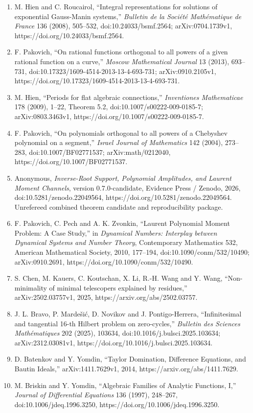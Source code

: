 \documentclass[
  11pt,
  a4paper,
]{amsart}
\begin{document}
\begin{enumerate}
{  ISSAC 2013}, 93--100, doi:10.1145/2465506.2465935; arXiv:1301.4313v2,
  https://doi.org/10.1145/2465506.2465935.
\item
  M. Hien and C. Roucairol, ``Integral representations for solutions of
  exponential Gauss-Manin systems,'' \emph{Bulletin de la Société
  Mathématique de France} 136 (2008), 505--532, doi:10.24033/bsmf.2564;
  arXiv:0704.1739v1, https://doi.org/10.24033/bsmf.2564.
\item
  F. Pakovich, ``On rational functions orthogonal to all powers of a
  given rational function on a curve,'' \emph{Moscow Mathematical
  Journal} 13 (2013), 693--731,
  doi:10.17323/1609-4514-2013-13-4-693-731; arXiv:0910.2105v1,
  https://doi.org/10.17323/1609-4514-2013-13-4-693-731.
\item
  M. Hien, ``Periods for flat algebraic connections,'' \emph{Inventiones
  Mathematicae} 178 (2009), 1--22, Theorem 5.2,
  doi:10.1007/s00222-009-0185-7; arXiv:0803.3463v1,
  https://doi.org/10.1007/s00222-009-0185-7.
\item
  F. Pakovich, ``On polynomials orthogonal to all powers of a Chebyshev
  polynomial on a segment,'' \emph{Israel Journal of Mathematics} 142
  (2004), 273--283, doi:10.1007/BF02771537; arXiv:math/0212040,
  https://doi.org/10.1007/BF02771537.
\item
  Anonymous, \emph{Inverse-Root Support, Polynomial Amplitudes, and
  Laurent Moment Channels}, version 0.7.0-candidate, Evidence Press /
  Zenodo, 2026, doi:10.5281/zenodo.22049564,
  https://doi.org/10.5281/zenodo.22049564. Unrefereed combined theorem
  candidate and reproducibility package.
\item
  F. Pakovich, C. Pech and A. K. Zvonkin, ``Laurent Polynomial Moment
  Problem: A Case Study,'' in \emph{Dynamical Numbers: Interplay between
  Dynamical Systems and Number Theory}, Contemporary Mathematics 532,
  American Mathematical Society, 2010, 177--194,
  doi:10.1090/conm/532/10490; arXiv:0910.2691,
  https://doi.org/10.1090/conm/532/10490.
\item
  S. Chen, M. Kauers, C. Koutschan, X. Li, R.-H. Wang and Y. Wang,
  ``Non-minimality of minimal telescopers explained by residues,''
  arXiv:2502.03757v1, 2025, https://arxiv.org/abs/2502.03757.
\item
  J. L. Bravo, P. Mardešić, D. Novikov and J. Pontigo-Herrera,
  ``Infinitesimal and tangential 16-th Hilbert problem on zero-cycles,''
  \emph{Bulletin des Sciences Mathématiques} 202 (2025), 103634,
  doi:10.1016/j.bulsci.2025.103634; arXiv:2312.03081v1,
  https://doi.org/10.1016/j.bulsci.2025.103634.
\item
  D. Batenkov and Y. Yomdin, ``Taylor Domination, Difference Equations,
  and Bautin Ideals,'' arXiv:1411.7629v1, 2014,
  https://arxiv.org/abs/1411.7629.
\item
  M. Briskin and Y. Yomdin, ``Algebraic Families of Analytic Functions,
  I,'' \emph{Journal of Differential Equations} 136 (1997), 248--267,
  doi:10.1006/jdeq.1996.3250, https://doi.org/10.1006/jdeq.1996.3250.
\end{enumerate}
\end{document}
